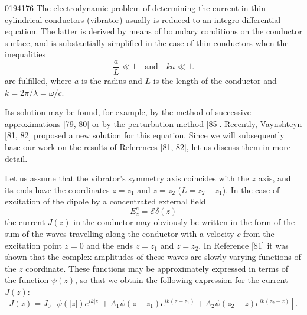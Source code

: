 \begin{scanpage}{0194}{176}
The electrodynamic problem of determining the current in thin cylindrical conductors (vibrator) usually is reduced to an integro-differential equation. The latter is derived by means of boundary conditions on the conductor surface, and is substantially simplified in the case of thin conductors when the inequalities
\[
\frac aL\ll1\quad\text{and}\quad ka\ll1.\tag{28.01}
\]
are fulfilled, where $a$ is the radius and $L$ is the length of the conductor and $k=2\pi/\lambda=\omega/c$.

Its solution may be found, for example, by the method of successive approximations [79, 80] or by the perturbation method [85]. Recently, Vaynshteyn [81, 82] proposed a new solution for this equation. Since we will subsequently base our work on the results of References [81, 82], let us discuss them in more detail.

Let us assume that the vibrator's symmetry axis coincides with the $z$ axis, and its ends have the coordinates $z=z_1$ and $z=z_2$ ($L=z_2-z_1$). In the case of excitation of the dipole by a concentrated external field
\[
E_z^e=\mathcal E\delta(z)\tag{28.02}
\]
the current $J(z)$ in the conductor may obviously be written in the form of the sum of the waves travelling along the conductor with a velocity $c$ from the excitation point $z=0$ and the ends $z=z_1$ and $z=z_2$. In Reference [81] it was shown that the complex amplitudes of these waves are slowly varying functions of the $z$ coordinate. These functions may be approximately expressed in terms of the function $\psi(z)$, so that we obtain the following expression for the current $J(z)$:
\[
J(z)=J_0[\psi(|z|)e^{ik|z|}+A_1\psi(z-z_1)e^{ik(z-z_1)}+A_2\psi(z_2-z)e^{ik(z_2-z)}].\tag{28.03}
\]
\end{scanpage}
